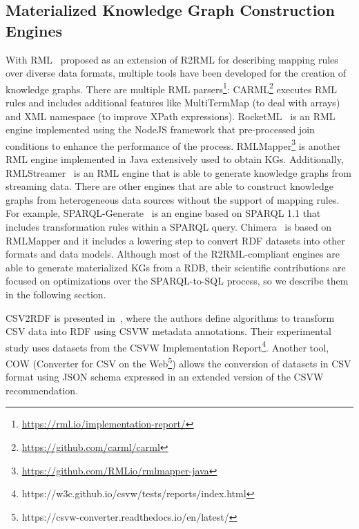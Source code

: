 \subsection{Materialized Knowledge Graph Construction Engines}
With RML~\citep{dimou2014rml} proposed as an extension of R2RML for describing mapping rules over diverse data formats, multiple tools have been developed for the creation of knowledge graphs. There are multiple RML parsers\footnote{\url{https://rml.io/implementation-report/}}: CARML\footnote{\url{https://github.com/carml/carml}} executes RML rules and includes additional features like MultiTermMap (to deal with arrays) and XML namespace (to improve XPath expressions). RocketML~\citep{csimcsek2019rocketrml} is an RML engine implemented using the NodeJS framework that pre-processed join conditions to enhance the performance of the process. RMLMapper\footnote{\url{https://github.com/RMLio/rmlmapper-java}} is another RML engine implemented in Java extensively used to obtain KGs. Additionally, RMLStreamer~\citep{haesendonck2019parallel} is an RML engine that is able to generate knowledge graphs from streaming data. There are other engines that are able to construct knowledge graphs from heterogeneous data sources without the support of mapping rules. For example, SPARQL-Generate~\citep{lefranccois2017sparql} is an engine based on SPARQL 1.1 that includes transformation rules within a SPARQL query. Chimera~\citep{scrocca2020turning} is based on RMLMapper and it includes a lowering step to convert RDF datasets into other formats and data models. Although most of the R2RML-compliant engines are able to generate materialized KGs from a RDB, their scientific contributions are focused on optimizations over the SPARQL-to-SQL process, so we describe them in the following section.

CSV2RDF is presented in~\citep{Mahmud2018}, where the authors define algorithms to transform CSV data into RDF using CSVW metadata annotations. Their experimental study uses datasets from the CSVW Implementation Report\footnote{https://w3c.github.io/csvw/tests/reports/index.html}. Another tool, COW (Converter for CSV on the Web\footnote{https://csvw-converter.readthedocs.io/en/latest/}) allows the conversion of datasets in CSV format using JSON schema expressed in an extended version of the CSVW recommendation. 

